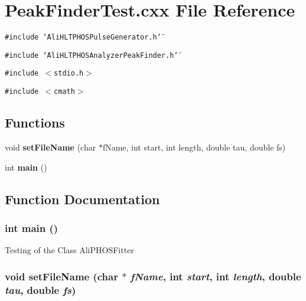 \section{Peak\-Finder\-Test.cxx File Reference}
\label{PeakFinderTest_8cxx}
{\tt \#include \char`\"{}Ali\-HLTPHOSPulse\-Generator.h\char`\"{}}\par
{\tt \#include \char`\"{}Ali\-HLTPHOSAnalyzer\-Peak\-Finder.h\char`\"{}}\par
{\tt \#include $<$stdio.h$>$}\par
{\tt \#include $<$cmath$>$}\par
\subsection*{Functions}
\begin{CompactItemize}
\item 
void {\bf set\-File\-Name} (char $\ast$f\-Name, int start, int length, double tau, double fs)
\item 
int {\bf main} ()
\end{CompactItemize}


\subsection{Function Documentation}
\subsubsection{\setlength{\rightskip}{0pt plus 5cm}int main ()}\label{PeakFinderTest_8cxx_a1}


Testing of the Class Ali\-PHOSFitter 
\subsubsection{\setlength{\rightskip}{0pt plus 5cm}void set\-File\-Name (char $\ast$ {\em f\-Name}, int {\em start}, int {\em length}, double {\em tau}, double {\em fs})}\label{PeakFinderTest_8cxx_a0}


